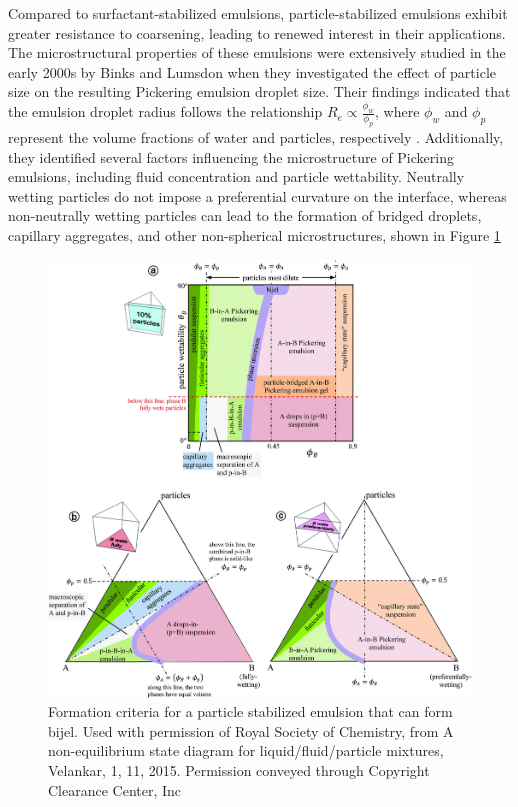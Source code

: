 Compared to surfactant-stabilized emulsions, particle-stabilized emulsions exhibit greater resistance to coarsening, leading to renewed interest in their applications. 
The microstructural properties of these emulsions were extensively studied in the early 2000s by Binks and Lumsdon when they investigated the effect of particle size
on the resulting Pickering emulsion droplet size. \cite{binks_pickering_2001} Their findings 
indicated that the emulsion droplet radius follows the relationship $R_e \propto \frac{\phi_w}{\phi_p}$, where $\phi_w$ and $\phi_p$ represent the volume fractions of water and particles, 
respectively \cite{binks_pickering_2001}. Additionally, they identified several factors influencing the microstructure of Pickering emulsions, including fluid concentration 
and particle wettability. Neutrally wetting particles do not impose a preferential curvature on the interface, whereas non-neutrally wetting particles can lead to the 
formation of bridged droplets, capillary aggregates, and other non-spherical microstructures, shown in Figure \ref{fig:state_diagram_particle_emulsions}

\begin{figure}
    \centering
    \includegraphics[scale = 0.3]{figures/literature_review/state_diagram.jpg}
    \caption{Formation criteria for a particle stabilized emulsion that can form bijel. \cite{velankar_non-equilibrium_2015}
            Used with permission of Royal Society of Chemistry, from A non-equilibrium state diagram for liquid/fluid/particle 
            mixtures, Velankar, 1, 11, 2015. Permission conveyed through Copyright Clearance Center, Inc}
    \label{fig:state_diagram_particle_emulsions}
\end{figure}

